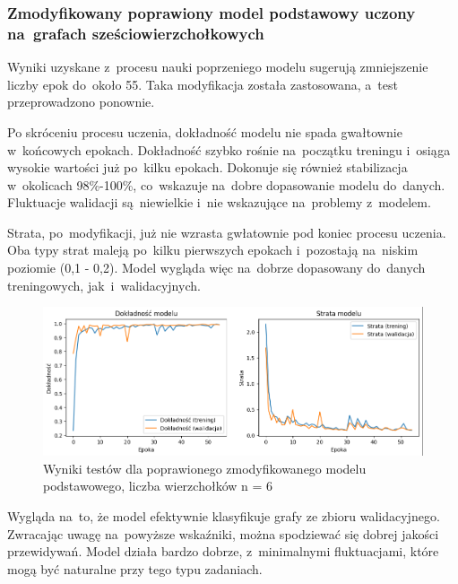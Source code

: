 
\subsubsection{Zmodyfikowany poprawiony model podstawowy uczony na~grafach sześciowierzchołkowych}

Wyniki uzyskane z~procesu nauki poprzeniego modelu sugerują zmniejszenie liczby epok do~około 55.
Taka modyfikacja została zastosowana, a~test przeprowadzono ponownie.

Po skróceniu procesu uczenia, dokładność modelu nie spada gwałtownie w~końcowych epokach.
Dokładność szybko rośnie na~początku treningu i~osiąga wysokie wartości już po~kilku epokach.
Dokonuje się również stabilizacja w~okolicach 98\%-100\%, co~wskazuje na~dobre dopasowanie modelu do~danych.
Fluktuacje walidacji są~niewielkie i~nie wskazujące na~problemy z~modelem.

Strata, po~modyfikacji, już nie wzrasta gwłatownie pod koniec procesu uczenia.
Oba typy strat maleją po~kilku pierwszych epokach i~pozostają na~niskim poziomie (0,1 - 0,2).
Model wygląda więc na~dobrze dopasowany do~danych treningowych, jak~i~walidacyjnych.

\begin{figure}[ht]
	\centering
	\includegraphics[width=15.5cm]{resources/tests/images/v4/base6_1_1_img.png}
	\caption{Wyniki testów dla poprawionego zmodyfikowanego modelu podstawowego, liczba wierzchołków n = 6}
	\label{Fig:tests-best-1a}
\end{figure}
\FloatBarrier

Wygląda na~to, że model efektywnie klasyfikuje grafy ze zbioru walidacyjnego.
Zwracając uwagę na~powyższe wskaźniki, można spodziewać się dobrej jakości przewidywań.
Model działa bardzo dobrze, z~minimalnymi fluktuacjami, które mogą być naturalne przy tego typu zadaniach.

